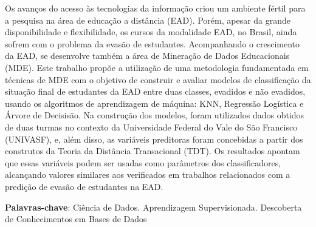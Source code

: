 \setlength{\absparsep}{18pt} %
\begin{resumo}

  Os avanços do acesso às tecnologias da informação criou um ambiente fértil
  para a pesquisa na área de educação a distância (EAD). Porém, apesar da grande
  disponibilidade e flexibilidade, os cursos da modalidade EAD, no Brasil, ainda
  sofrem com o problema da evasão de estudantes. Acompanhando o crescimento da
  EAD, se desenvolve também a área de Mineração de Dados Educacionais (MDE).
  Este trabalho propõe a utilização de uma metodologia fundamentada em técnicas
  de MDE com o objetivo de construir e avaliar modelos de classificação da
  situação final de estudantes da EAD entre duas classes, evadidos e não
  evadidos, usando os algoritmos de aprendizagem de máquina: KNN, Regressão
  Logística e Árvore de Decisisão. Na construção dos modelos, foram utilizados
  dados obtidos de duas turmas no contexto da Universidade Federal do Vale do
  São Francisco (UNIVASF), e, além disso, as variáveis preditoras foram
  concebidas a partir dos construtos da Teoria da Distância Transacional (TDT).
  Os resultados apontam que essas variáveis podem ser usadas como parâmetros dos
  classificadores, alcançando valores similares aos verificados em trabalhos
  relacionados com a predição de evasão de estudantes na EAD.

  \textbf{Palavras-chave}: Ciência de Dados. Aprendizagem Supervisionada.
  Descoberta de Conhecimentos em Bases de Dados

\end{resumo}
\newpage


